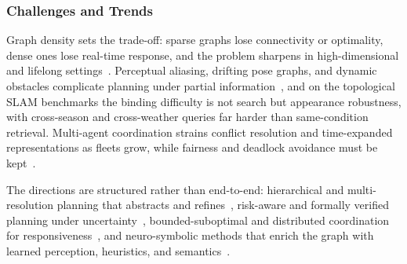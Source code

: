 \subsubsection{Challenges and Trends}
Graph density sets the trade-off: sparse graphs lose connectivity or optimality, dense ones lose real-time response, and the problem sharpens in high-dimensional and lifelong settings~\cite{Karaman2011RRTStar,Koenig2002DstarLite}. Perceptual aliasing, drifting pose graphs, and dynamic obstacles complicate planning under partial information~\cite{Thrun2005Probabilistic,Stachniss2006Mapping}, and on the topological SLAM benchmarks the binding difficulty is not search but appearance robustness, with cross-season and cross-weather queries far harder than same-condition retrieval. Multi-agent coordination strains conflict resolution and time-expanded representations as fleets grow, while fairness and deadlock avoidance must be kept~\cite{Sharon2015CBS,Yu2016OptimalMAPF,Stern2019MAPFsurvey}.

The directions are structured rather than end-to-end: hierarchical and multi-resolution planning that abstracts and refines~\cite{Botea2004HPA,Geisberger2008CH}, risk-aware and formally verified planning under uncertainty~\cite{Luders2010ChanceConstraints,zhang2023safety}, bounded-suboptimal and distributed coordination for responsiveness~\cite{Barer2014ECBS,Li2021EECBS}, and neuro-symbolic methods that enrich the graph with learned perception, heuristics, and semantics~\cite{kimura-etal-2021-neuro}.
